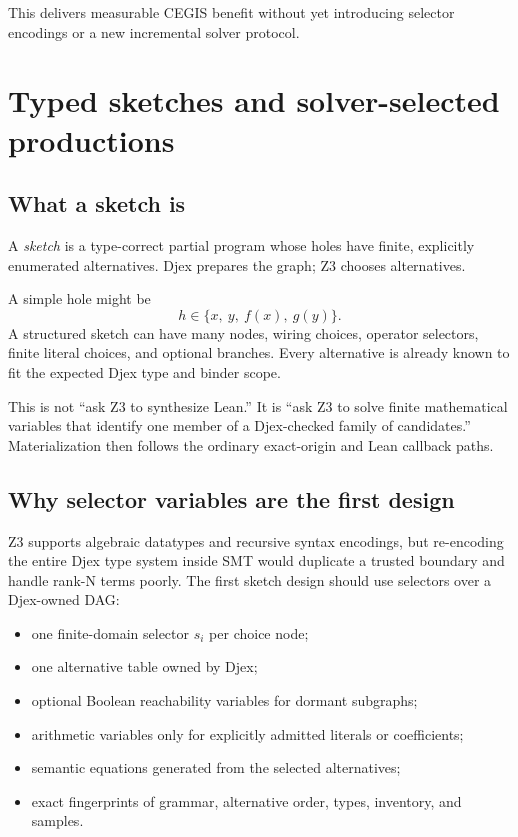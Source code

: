 \documentclass[10pt,letterpaper,oneside]{report}
\begin{document}
This delivers measurable CEGIS benefit without yet introducing selector encodings or a new incremental solver protocol.

\chapter{Typed sketches and solver-selected productions}
\label{chap:typed-sketches}

\section{What a sketch is}

A \emph{sketch} is a type-correct partial program whose holes have finite, explicitly enumerated alternatives. Djex prepares the graph; Z3 chooses alternatives.

A simple hole might be
\[
  h\in\{x,\ y,\ f(x),\ g(y)\}.
\]
A structured sketch can have many nodes, wiring choices, operator selectors, finite literal choices, and optional branches. Every alternative is already known to fit the expected Djex type and binder scope.

\begin{projectnote}
This is not ``ask Z3 to synthesize Lean.'' It is ``ask Z3 to solve finite mathematical variables that identify one member of a Djex-checked family of candidates.'' Materialization then follows the ordinary exact-origin and Lean callback paths.
\end{projectnote}

\section{Why selector variables are the first design}

Z3 supports algebraic datatypes and recursive syntax encodings, but re-encoding the entire Djex type system inside SMT would duplicate a trusted boundary and handle rank-N terms poorly. The first sketch design should use selectors over a Djex-owned DAG:

\begin{itemize}
\item one finite-domain selector $s_i$ per choice node;
\item one alternative table owned by Djex;
\item optional Boolean reachability variables for dormant subgraphs;
\item arithmetic variables only for explicitly admitted literals or coefficients;
\item semantic equations generated from the selected alternatives;
\item exact fingerprints of grammar, alternative order, types, inventory, and samples.
\end{itemize}
\end{document}
